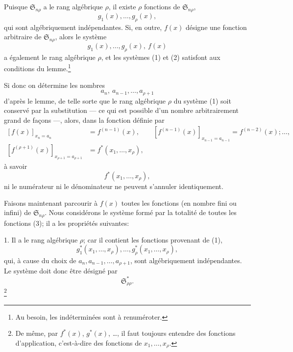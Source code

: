 \documentclass[11pt]{article}
\providecommand{\Ssys}{\mathfrak{S}}
\begin{document}
Puisque $\Ssys_{n\rho}$ a le rang algébrique $\rho$, il existe $\rho$ fonctions de $\Ssys_{n\rho}$,
\begin{equation}
  g_1(x),\ldots,g_\rho(x),
\tag{1}
\end{equation}
qui sont algébriquement indépendantes. Si, en outre, $f(x)$ désigne une fonction arbitraire de $\Ssys_{n\rho}$, alors le système
\begin{equation}
  g_1(x),\ldots,g_\rho(x),\ f(x)
\tag{2}
\end{equation}
a également le rang algébrique $\rho$, et les systèmes (1) et (2) satisfont aux conditions du lemme.\footnote{Au besoin, les indéterminées sont à renuméroter.}

Si donc on détermine les nombres
\[
  a_n,\ a_{n-1},\ldots,a_{\rho+1}
\]
d'après le lemme, de telle sorte que le rang algébrique $\rho$ du système (1) soit conservé par la substitution --- ce qui est possible d'un nombre arbitrairement grand de façons ---, alors, dans la fonction définie par
\[
\begin{aligned}
 [f(x)]_{x_n=a_n}&=f^{(n-1)}(x),\qquad
 [f^{(n-1)}(x)]_{x_{n-1}=a_{n-1}}=f^{(n-2)}(x);\ldots,\\
 [f^{(\rho+1)}(x)]_{x_{\rho+1}=a_{\rho+1}}&=f^*(x_1,\ldots,x_\rho),
\end{aligned}
\]
à savoir
\begin{equation}
  f^*(x_1,\ldots,x_\rho),
\tag{3}
\end{equation}
ni le numérateur ni le dénominateur ne peuvent s'annuler identiquement.

Faisons maintenant parcourir à $f(x)$ toutes les fonctions (en nombre fini ou infini) de $\Ssys_{n\rho}$. Nous considérons le système formé par la totalité de toutes les fonctions (3); il a les propriétés suivantes:

1. Il a le rang algébrique $\rho$; car il contient les fonctions provenant de (1),
\[
  g_1^*(x_1,\ldots,x_\rho),\ldots,g_\rho^*(x_1,\ldots,x_\rho),
\]
qui, à cause du choix de $a_n,a_{n-1},\ldots,a_{\rho+1}$, sont algébriquement indépendantes. Le système doit donc être désigné par
\[
  \Ssys^*_{\rho\rho}.
\]
\footnote{De même, par $f^*(x)$, $g^*(x)$, \ldots, il faut toujours entendre des fonctions d'application, c'est-à-dire des fonctions de $x_1,\ldots,x_\rho$.}
\end{document}
